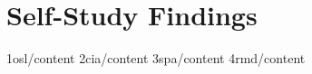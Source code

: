 \chapter{Self-Study Findings}
\blindtext
{1osl/content}
{2cia/content}
{3spa/content}
{4rmd/content}
